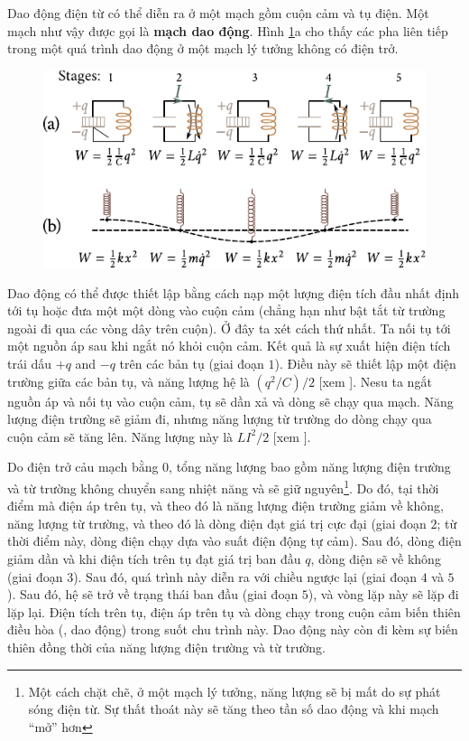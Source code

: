 Dao động điện từ có thể diễn ra ở một mạch gồm cuộn cảm và tụ điện.
Một mạch như vậy được gọi là \textbf{mạch dao động}.
Hình \ref{fig:13_1}a cho thấy các pha liên tiếp trong một quá trình dao động ở một mạch lý tưởng không có điện trở.

\begin{figure}[t]
	\begin{center}
		\includegraphics[scale=1.1]{figures/ch_13/fig_13_1.pdf}
		\caption[]{}
		\label{fig:13_1}
	\end{center}
	\vspace{-0.8cm}
\end{figure}

Dao động có thể được thiết lập bằng cách nạp một lượng điện tích đầu nhất định tới tụ hoặc đưa một một dòng vào cuộn cảm (chẳng hạn như bật tắt từ trường ngoài đi qua các vòng dây trên cuộn).
Ở đây ta xét cách thứ nhất.
Ta nối tụ tới một nguồn áp sau khi ngắt nó khỏi cuộn cảm.
Kết quả là sự xuất hiện điện tích trái dấu $+q$ and $-q$ trên các bản tụ (giai đoạn $1$).
Điều này sẽ thiết lập một điện trường giữa các bản tụ, và năng lượng hệ là $(q^2/C)/2$ [xem ].
Nesu ta ngắt nguồn áp và nối tụ vào cuộn cảm, tụ sẽ dần xả và dòng sẽ chạy qua mạch.
Năng lượng điện trường sẽ giảm đi, nhưng năng lượng từ trường do dòng chạy qua cuộn cảm sẽ tăng lên.
Năng lượng này là $LI^2/2$ [xem ].

Do điện trở cảu mạch bằng 0, tổng năng lượng bao gồm năng lượng điện trường và từ trường không chuyển sang nhiệt năng và sẽ giữ nguyên\footnote{Một cách chặt chẽ, ở một mạch lý tưởng, năng lượng sẽ bị mất do sự phát sóng điện từ. Sự thất thoát này sẽ tăng theo tần số dao động và khi mạch ``mở'' hơn}.
Do đó, tại thời điểm mà điện áp trên tụ, và theo đó là năng lượng điện trường giảm về không, năng lượng từ trường, và theo đó là dòng điện đạt giá trị cực đại (giai đoạn $2$; từ thời điểm này, dòng điện chạy dựa vào suất điện động tự cảm).
Sau đó, dòng điện giảm dần và khi điện tích trên tụ đạt giá trị ban đầu $q$, dòng điện sẽ về không (giai đoạn $3$).
Sau đó, quá trình này diễn ra với chiều ngược lại (giai đoạn $4$ và $5$).
Sau đó, hệ sẽ trở về trạng thái ban đầu (giai đoạn $5$), và vòng lặp này sẽ lặp đi lặp lại.
Điện tích trên tụ, điện áp trên tụ và dòng chạy trong cuộn cảm biến thiên điều hòa (\ie, dao động) trong suốt chu trình này.
Dao động này còn đi kèm sự biến thiên đồng thời của năng lượng điện trường và từ trường.

